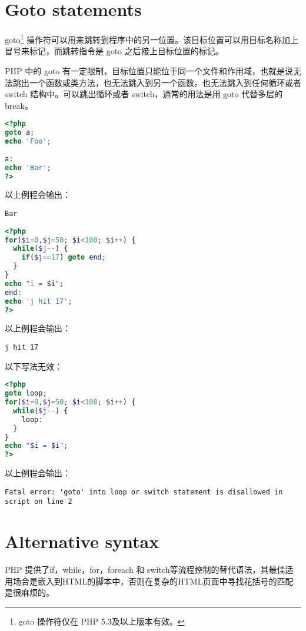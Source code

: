 \section{Goto statements}

goto\footnote{goto 操作符仅在 PHP 5.3及以上版本有效。} 操作符可以用来跳转到程序中的另一位置。该目标位置可以用目标名称加上冒号来标记，而跳转指令是 goto 之后接上目标位置的标记。

PHP 中的 goto 有一定限制，目标位置只能位于同一个文件和作用域，也就是说无法跳出一个函数或类方法，也无法跳入到另一个函数。也无法跳入到任何循环或者 switch 结构中。可以跳出循环或者 switch，通常的用法是用 goto 代替多层的 break。

\begin{lstlisting}[language=PHP]
<?php
goto a;
echo 'Foo';
 
a:
echo 'Bar';
?>
\end{lstlisting}

以上例程会输出：

\begin{verbatim}
Bar
\end{verbatim}

\begin{lstlisting}[language=PHP]
<?php
for($i=0,$j=50; $i<100; $i++) {
  while($j--) {
    if($j==17) goto end; 
  }  
}
echo "i = $i";
end:
echo 'j hit 17';
?>
\end{lstlisting}

以上例程会输出：

\begin{verbatim}
j hit 17
\end{verbatim}

以下写法无效：

\begin{lstlisting}[language=PHP]
<?php
goto loop;
for($i=0,$j=50; $i<100; $i++) {
  while($j--) {
    loop:
  }
}
echo "$i = $i";
?>
\end{lstlisting}

以上例程会输出：

\begin{verbatim}
Fatal error: 'goto' into loop or switch statement is disallowed in
script on line 2
\end{verbatim}


\section{Alternative syntax}


PHP 提供了if，while，for，foreach 和 switch等流程控制的替代语法，其最佳适用场合是嵌入到HTML的脚本中，否则在复杂的HTML页面中寻找花括号的匹配是很麻烦的。

